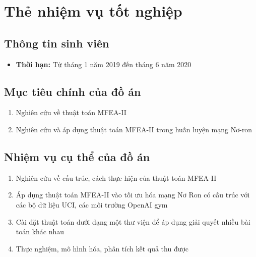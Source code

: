 \chapter*{Thẻ nhiệm vụ tốt nghiệp}
\section*{Thông tin sinh viên}

\begin{itemize}
\item \textbf{Thời hạn:} Từ tháng 1 năm 2019 đến tháng 6 năm 2020
\end{itemize}
\section*{Mục tiêu chính của đồ án}
\begin{enumerate}
    \item Nghiên cứu về thuật toán MFEA-II
    \item Nghiên cứu và áp dụng thuật toán MFEA-II trong huấn luyện mạng Nơ-ron
\end{enumerate}

\section*{Nhiệm vụ cụ thể của đồ án}
\begin{enumerate}
    \item Nghiên cứu về cấu trúc, cách thực hiện của thuật toán MFEA-II
    \item Áp dụng thuật toán MFEA-II vào tối ưu hóa mạng Nơ Ron có cấu trúc với các bộ dữ liệu UCI, các môi trường OpenAI gym
    \item Cài đặt thuật toán dưới dạng một thư viện để áp dụng giải quyết nhiều bài toán khác nhau
    \item Thực nghiệm, mô hình hóa, phân tích kết quả thu được
\end{enumerate}

